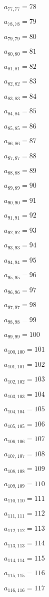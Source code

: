 \documentclass[a4paper,12pt]{article}
\begin{document}
$a _{ 77, 77 } = 78$

$a _{ 78, 78 } = 79$

$a _{ 79, 79 } = 80$

$a _{ 80, 80 } = 81$

$a _{ 81, 81 } = 82$

$a _{ 82, 82 } = 83$

$a _{ 83, 83 } = 84$

$a _{ 84, 84 } = 85$

$a _{ 85, 85 } = 86$

$a _{ 86, 86 } = 87$

$a _{ 87, 87 } = 88$

$a _{ 88, 88 } = 89$

$a _{ 89, 89 } = 90$

$a _{ 90, 90 } = 91$

$a _{ 91, 91 } = 92$

$a _{ 92, 92 } = 93$

$a _{ 93, 93 } = 94$

$a _{ 94, 94 } = 95$

$a _{ 95, 95 } = 96$

$a _{ 96, 96 } = 97$

$a _{ 97, 97 } = 98$

$a _{ 98, 98 } = 99$

$a _{ 99, 99 } = 100$

$a _{ 100, 100 } = 101$

$a _{ 101, 101 } = 102$

$a _{ 102, 102 } = 103$

$a _{ 103, 103 } = 104$

$a _{ 104, 104 } = 105$

$a _{ 105, 105 } = 106$

$a _{ 106, 106 } = 107$

$a _{ 107, 107 } = 108$

$a _{ 108, 108 } = 109$

$a _{ 109, 109 } = 110$

$a _{ 110, 110 } = 111$

$a _{ 111, 111 } = 112$

$a _{ 112, 112 } = 113$

$a _{ 113, 113 } = 114$

$a _{ 114, 114 } = 115$

$a _{ 115, 115 } = 116$

$a _{ 116, 116 } = 117$
\end{document}
